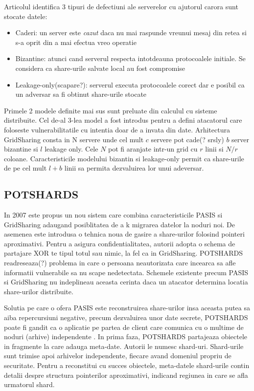 \documentclass{llncs}
\begin{document}
Articolul identifica 3 tipuri de defectiuni ale serverelor cu ajutorul carora sunt stocate datele:
\begin{itemize}
	\item Caderi: un server este \textit{cazut} daca nu mai raspunde vreunui mesaj din retea si s-a oprit din a mai efectua vreo operatie 
	\item Bizantine: atunci cand serverul respecta intotdeauna protocoalele initiale. Se considera ca share-urile salvate local au fost compromise
	\item Leakage-only(scapare?): serverul executa protocoalele corect dar e posibil ca un adversar sa fi obtinut share-urile stocate
\end{itemize}
Primele 2 modele definite mai sus sunt preluate din calculul cu sisteme distribuite. Cel de-al 3-lea model a fost introdus pentru a defini atacatorul care foloseste vulnerabilitatile cu intentia doar de a invata din date. Arhitectura GridSharing consta in N servere unde cel mult $c$ servere pot cade(? srsly) $b$ server bizantine si $l$ leakage only. Cele $N$ pot fi aranjate intr-un grid cu $r$ linii si $N/r$ coloane. Caracteristicile modelului bizantin si leakage-only permit ca share-urile de pe cel mult $l + b$ linii sa permita dezvaluirea lor unui adeversar.  

\subsection{POTSHARDS} 
In 2007 este propus un nou sistem care combina caracteristicile PASIS si GridSharing adaugand posiblitatea de a k migrarea datelor la noduri noi.
De asemenea este introdusa o tehnica noua de gasire a share-urilor folosind pointeri aproximativi. Pentru a asigura confidentialitatea, autorii adopta o schema de partajare XOR te tipul totul sau nimic, la fel ca in GridSharing.
POTSHARDS readreseaza(?) problema in care o persoana neautorizata care incearca sa afle informatii vulnerabile sa nu scape nedetectata. Schemele existente precum PASIS si GridSharing nu indeplineau aceasta cerinta daca un atacator determina locatia share-urilor distribuite.

Solutia pe care o ofera PASIS este reconstruirea share-urilor insa aceasta putea sa aiba repercursiuni negative, precum dezvaluirea unor date secrete,
POTSHARDS poate fi gandit ca o aplicatie pe partea de client care comunica cu o multime de noduri (arhive) independente . In prima faza, POTSHARDS partajeaza obiectele in fragmente la care adauga meta-date. Autorii le numesc shard-uri. Shard-urile sunt trimise apoi arhivelor independente, fiecare avand domeniul propriu de securitate. Pentru a reconstitui cu succes obiectele, meta-datele shard-urile contin detalii despre structura pointerilor aproximativi, indicand regiunea in care se afla urmatorul shard.
\end{document}
